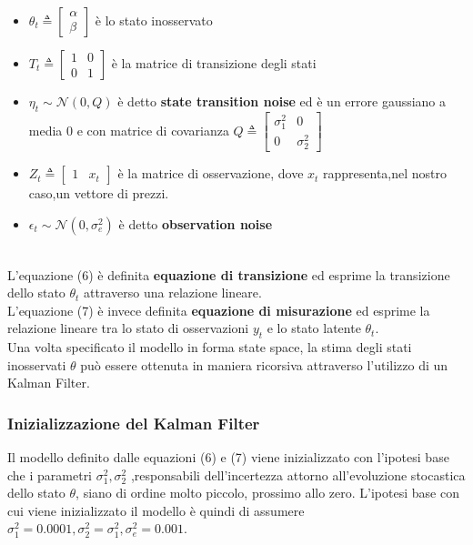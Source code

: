 \documentclass[]{article}
\begin{document}
\begin{itemize}
	\item $\theta_t \triangleq \begin{bmatrix}
		\alpha\\
		\beta
	\end{bmatrix}$ è lo stato inosservato
	
	\item $T_t \triangleq \begin{bmatrix}
		1 & 0 \\
		0 & 1
	\end{bmatrix}$ è la matrice di transizione degli stati
	
	\item $\eta_t \sim \mathcal{N}(0,Q)$ è detto \textbf{state transition noise} ed è un errore gaussiano a media 0 e con matrice di covarianza $Q \triangleq \begin{bmatrix}
		\sigma^2_1 & 0 \\
		0 & 	\sigma^2_2
	\end{bmatrix}$
	
	\item $Z_t \triangleq  \begin{bmatrix}
		1 & x_t
	\end{bmatrix}$ è la matrice di osservazione, dove $x_t$ rappresenta,nel nostro caso,un vettore di prezzi.
	
	\item $\epsilon_t \sim \mathcal{N}(0,\sigma^2_e)$ è detto \textbf{observation noise} 
\end{itemize}
\
\\
L'equazione (6) è definita \textbf{equazione di transizione} ed esprime la transizione dello stato $\theta_t$ attraverso una relazione lineare.
\\
L'equazione (7) è invece definita \textbf{equazione di misurazione} ed esprime la relazione lineare tra lo stato di osservazioni $y_t$ e lo stato latente $\theta_t$.
\\
Una volta specificato il modello in forma state space, la stima degli stati inosservati $\theta$ può essere ottenuta in maniera ricorsiva attraverso l'utilizzo di un Kalman Filter.
\\
\subsubsection{Inizializzazione del Kalman Filter}
Il modello definito dalle equazioni (6) e (7) viene inizializzato con l'ipotesi base che i  parametri $\sigma^2_1,\sigma^2_2$ ,responsabili dell'incertezza attorno all'evoluzione stocastica dello stato $\theta$, siano di ordine molto piccolo, prossimo allo zero.
L'ipotesi base con cui viene inizializzato il modello è quindi di assumere $\sigma^2_1=0.0001, \sigma^2_2=\sigma^2_1,  \sigma^2_e=0.001$.
\end{document}
